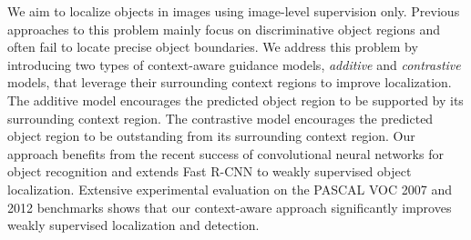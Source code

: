 We aim to localize objects in images using image-level supervision only.
Previous approaches to this problem mainly focus on discriminative object
regions and often fail to locate precise object boundaries. 
We address this problem by introducing two types of context-aware guidance models, {\em additive
} and {\em contrastive} models, that leverage their surrounding context regions to improve localization. 
The additive model encourages the predicted object region to be
supported by its surrounding context region. 
The contrastive model encourages the
predicted object region to be outstanding from its surrounding context region.
Our approach benefits from the recent success of convolutional neural networks
for object recognition and extends Fast R-CNN to weakly supervised object localization.
Extensive experimental evaluation on the PASCAL VOC 2007 and 2012 benchmarks shows that our context-aware approach significantly improves weakly supervised localization and detection.


